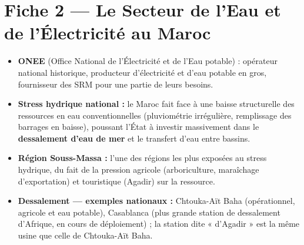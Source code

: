 \section{Fiche 2 --- Le Secteur de l'Eau et de l'Électricité au Maroc}
\begin{itemize}
    \item \textbf{ONEE} (Office National de l'Électricité et de l'Eau potable) : opérateur national historique, producteur d'électricité et d'eau potable en gros, fournisseur des SRM pour une partie de leurs besoins.
    \item \textbf{Stress hydrique national :} le Maroc fait face à une baisse structurelle des ressources en eau conventionnelles (pluviométrie irrégulière, remplissage des barrages en baisse), poussant l'État à investir massivement dans le \textbf{dessalement d'eau de mer} et le transfert d'eau entre bassins.
    \item \textbf{Région Souss-Massa :} l'une des régions les plus exposées au stress hydrique, du fait de la pression agricole (arboriculture, maraîchage d'exportation) et touristique (Agadir) sur la ressource.
    \item \textbf{Dessalement --- exemples nationaux :} Chtouka-Aït Baha (opérationnel, agricole et eau potable), Casablanca (plus grande station de dessalement d'Afrique, en cours de déploiement) ; la station dite « d'Agadir » est la même usine que celle de Chtouka-Aït Baha.
\end{itemize}

